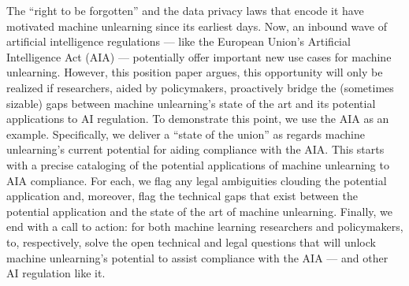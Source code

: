 The ``right to be forgotten'' and the data privacy laws that encode it have motivated machine unlearning since its earliest days. Now, an inbound wave of artificial intelligence regulations --- like the European Union's Artificial Intelligence Act (AIA) --- potentially offer important new use cases for machine unlearning.
%  
However, this position paper argues, this opportunity will only be realized if researchers, aided by policymakers, proactively bridge the (sometimes sizable) gaps between machine unlearning's state of the art and its potential applications to AI regulation. To demonstrate this point, we use the AIA as an example. Specifically, we deliver a ``state of the union'' as regards machine unlearning's current potential for aiding compliance with the AIA. This starts with a precise cataloging of the potential applications of machine unlearning to AIA compliance. For each, we flag any legal ambiguities clouding the potential application and, moreover, flag the technical gaps that exist between the potential application and the state of the art of machine unlearning. Finally, we end with a call to action: for both machine learning researchers and policymakers, to, respectively, solve the open technical and legal questions that will unlock machine unlearning's potential to assist compliance with the AIA --- and other AI regulation like it.